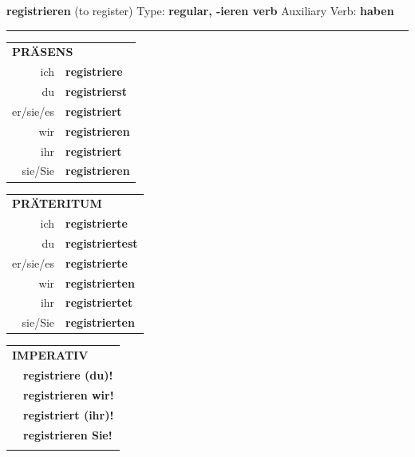 \documentclass[10pt,a4paper]{revtex4-2}
\begin{document}
\begin{verbbox}
    {\Large \bf registrieren} (to register) \hfill Type: \textbf{regular, -ieren verb} \hfill Auxiliary Verb: \textbf{haben} 
    
     \vspace{5pt}

    \hrule
    
    \vspace{5pt}

  \begin{tabular}{rl}
     \multicolumn{2}{l}{\textbf{PRÄSENS} }\\
    ich & \textbf{registriere}\\
    du & \textbf{registrierst}\\
    er/sie/es & \textbf{registriert}\\
    wir & \textbf{registrieren}\\
    ihr & \textbf{registriert}\\
    sie/Sie & \textbf{registrieren}\\
  \end{tabular}
  \hfill
     \begin{tabular}{rl}
    \multicolumn{2}{l}{\textbf{PRÄTERITUM} }\\
    ich & \textbf{registrierte}\\
    du & \textbf{registriertest}\\
    er/sie/es & \textbf{registrierte}\\
    wir & \textbf{registrierten}\\
    ihr & \textbf{registriertet}\\
    sie/Sie & \textbf{registrierten}\\
  \end{tabular}
  \hfill
  \begin{tabular}{rl}
     \multicolumn{2}{l}{\textbf{IMPERATIV} }\\
   & \textbf{registriere (du)!}\\
   & \textbf{registrieren wir!}\\
   & \textbf{registriert (ihr)!}\\
   & \textbf{registrieren Sie!}\\
   & \vspace{10pt}
  \end{tabular}

    \vspace{10pt}


\end{verbbox}
\end{document}
